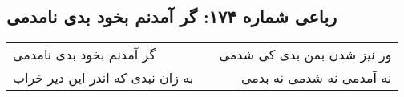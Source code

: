 \begin{center}
\section*{رباعی شماره ۱۷۴: گر آمدنم بخود بدی نامدمی}
\label{sec:sh174}
\begin{longtable}{l p{0.5cm} r}
گر آمدنم بخود بدی نامدمی
&&
ور نیز شدن بمن بدی کی شدمی
\\
به زان نبدی که اندر این دیر خراب
&&
نه آمدمی نه شدمی نه بدمی
\\
\end{longtable}
\end{center}
